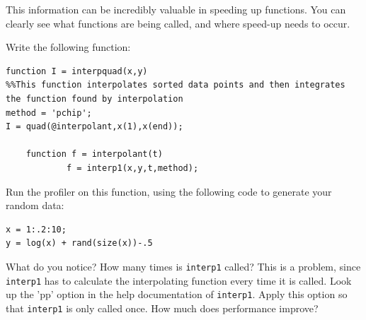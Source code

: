 This information can be incredibly valuable in speeding up functions. You can clearly see what functions are being called, and where speed-up needs to occur.

\begin{problem}
Write the following function:
\begin{verbatim}
function I = interpquad(x,y)
%%This function interpolates sorted data points and then integrates the function found by interpolation
method = 'pchip';
I = quad(@interpolant,x(1),x(end));

    function f = interpolant(t)
            f = interp1(x,y,t,method); 
\end{verbatim}

Run the profiler on this function, using the following code to generate your random data:

\begin{verbatim}
x = 1:.2:10;
y = log(x) + rand(size(x))-.5
\end{verbatim}

What do you notice? How many times is {\tt interp1} called? This is a problem, since {\tt interp1} has to calculate the interpolating function every time it is called. Look up the 'pp' option in the help documentation of {\tt interp1}. Apply this option so that {\tt interp1} is only called once. How much does performance improve?
\end{problem}


